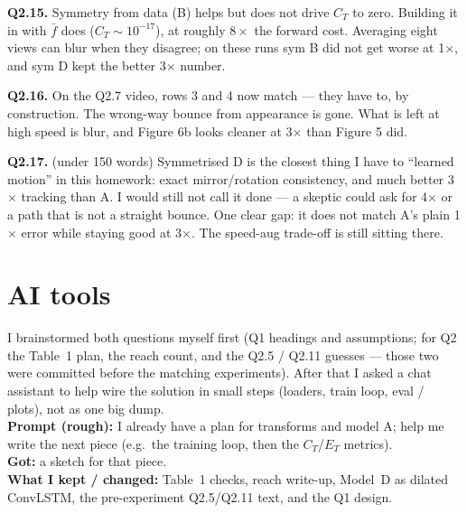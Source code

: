 \documentclass[11pt,a4paper]{article}
\begin{document}
\textbf{Q2.15.} Symmetry from data (B) helps but does not drive $C_T$ to zero. Building it in with $\bar f$ does ($C_T\sim 10^{-17}$), at roughly $8\times$ the forward cost. Averaging eight views can blur when they disagree; on these runs sym B did not get worse at 1$\times$, and sym D kept the better 3$\times$ number.

\textbf{Q2.16.} On the Q2.7 video, rows 3 and 4 now match --- they have to, by construction. The wrong-way bounce from appearance is gone. What is left at high speed is blur, and Figure 6b looks cleaner at 3$\times$ than Figure 5 did.

\textbf{Q2.17.} (under 150 words) Symmetrised D is the closest thing I have to ``learned motion'' in this homework: exact mirror/rotation consistency, and much better 3$\times$ tracking than A. I would still not call it done --- a skeptic could ask for 4$\times$ or a path that is not a straight bounce. One clear gap: it does not match A's plain 1$\times$ error while staying good at 3$\times$. The speed-aug trade-off is still sitting there.

\section*{AI tools}

I brainstormed both questions myself first (Q1 headings and assumptions; for Q2 the Table~1 plan, the reach count, and the Q2.5 / Q2.11 guesses --- those two were committed before the matching experiments). After that I asked a chat assistant to help wire the solution in small steps (loaders, train loop, eval / plots), not as one big dump.\\[0.35em]
\textbf{Prompt (rough):} I already have a plan for transforms and model A; help me write the next piece (e.g.\ the training loop, then the $C_T$/$E_T$ metrics).\\
\textbf{Got:} a sketch for that piece.\\
\textbf{What I kept / changed:} Table~1 checks, reach write-up, Model~D as dilated ConvLSTM, the pre-experiment Q2.5/Q2.11 text, and the Q1 design.
\end{document}
